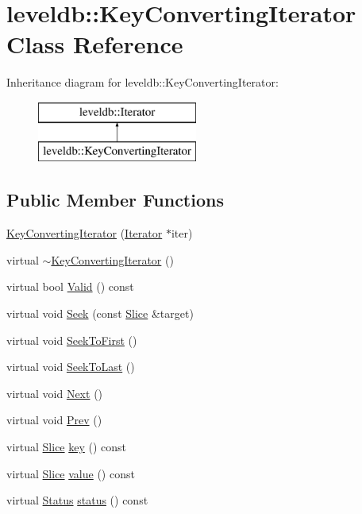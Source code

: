 \hypertarget{classleveldb_1_1_key_converting_iterator}{}\section{leveldb\+:\+:Key\+Converting\+Iterator Class Reference}
\label{classleveldb_1_1_key_converting_iterator}
Inheritance diagram for leveldb\+:\+:Key\+Converting\+Iterator\+:\begin{figure}[H]
\begin{center}
\leavevmode
\includegraphics[height=2.000000cm]{classleveldb_1_1_key_converting_iterator}
\end{center}
\end{figure}
\subsection*{Public Member Functions}
\begin{DoxyCompactItemize}
\item 
\hyperlink{classleveldb_1_1_key_converting_iterator_a7b5c28a94749f2e02ecc9021bb9adb51}{Key\+Converting\+Iterator} (\hyperlink{classleveldb_1_1_iterator}{Iterator} $\ast$iter)
\item 
virtual \hyperlink{classleveldb_1_1_key_converting_iterator_a2a774b0a90768168394ca0c35ba3a87e}{$\sim$\+Key\+Converting\+Iterator} ()
\item 
virtual bool \hyperlink{classleveldb_1_1_key_converting_iterator_a941cabf2e0b1c9647faa037b7ad55668}{Valid} () const 
\item 
virtual void \hyperlink{classleveldb_1_1_key_converting_iterator_a6af9b763a5831c2fdcd8c3bebfef6ae4}{Seek} (const \hyperlink{classleveldb_1_1_slice}{Slice} \&target)
\item 
virtual void \hyperlink{classleveldb_1_1_key_converting_iterator_a56a6b7b97747d5e33981a66c28670cc9}{Seek\+To\+First} ()
\item 
virtual void \hyperlink{classleveldb_1_1_key_converting_iterator_a9db639879c442a67234fc345887b19fc}{Seek\+To\+Last} ()
\item 
virtual void \hyperlink{classleveldb_1_1_key_converting_iterator_a6b468c158da3f6abbc697f7728811da8}{Next} ()
\item 
virtual void \hyperlink{classleveldb_1_1_key_converting_iterator_adff607836b7b3d117a524b3d440bc55a}{Prev} ()
\item 
virtual \hyperlink{classleveldb_1_1_slice}{Slice} \hyperlink{classleveldb_1_1_key_converting_iterator_a46402aaa27d57c5b2bee4f560c2dc04b}{key} () const 
\item 
virtual \hyperlink{classleveldb_1_1_slice}{Slice} \hyperlink{classleveldb_1_1_key_converting_iterator_aa7a0281f93fbd520bf54d94bac77197a}{value} () const 
\item 
virtual \hyperlink{classleveldb_1_1_status}{Status} \hyperlink{classleveldb_1_1_key_converting_iterator_a10d0f5b6b83bc967ba5c73d6bfc919f3}{status} () const 
\end{DoxyCompactItemize}
